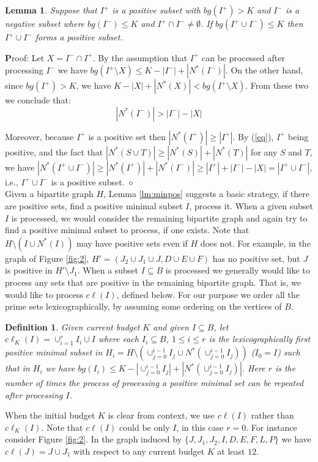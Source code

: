 \documentclass[letterpaper,11pt,abstracton]{scrartcl}
\newcommand{\qed}{\hfill$\diamond$}
\newcommand{\pf}{{\textbf Proof: }}
\newtheorem{lemma}[theorem]{Lemma}
\newtheorem{dfn}[theorem]{Definition}
\begin{document}
\begin{lemma}\label{correctness}
Suppose that $I^{+}$ is a positive subset with $bg(I^+) > K$
and $I^{-}$ is a negative subset where $bg(I^{-}) \le K$ and $I^+ \cap I^- \ne\emptyset$.
If $bg( I^{+} \cup I^{-}) \le K$ then $I^{+} \cup I^{-}$ forms a positive subset.
\end{lemma}
\pf Let $X=I^-\cap I^+$. By the assumption that $I^+$ can be processed after processing
$I^-$ we have $bg(I^+\setminus X)\leq K-|I^-|+|N^*(I^-)|$. On the other hand, since $bg(I^+)>K$, we have
$K-|X|+|N^*(X)|<bg(I^+\setminus X)$. From these two we conclude that:\\
\begin{equation}\label{eq}
|N^*(I^-)|>|I^-|-|X|
\end{equation}

Moreover, because $I^+$ is a positive set then $|N^*(I^+)|\geq |I^+|$.
By (\ref{eq}), $I^+$ being positive, and the fact that
$|N^*(S \cup T)| \geq |N^*(S)| + |N^*(T)|$ for any $S$ and $T$, we have
$|N^*(I^+\cup I^-)| \geq |N^*(I^+)|+|N^*(I^-)|\geq |I^+|+|I^-|-|X| = |I^+\cup I^-|$, i.e., $I^+\cup I^-$ is a positive subset.
\qed \\


Given a bipartite graph $H$, Lemma \ref{lm:minpos} suggests a basic strategy,
if there are positive sets, find a positive minimal subset $I$, process it.  When a given subset $I$ is processed, we
would consider the remaining bipartite graph and again try to find a positive
minimal subset to process, if one exists. Note that
$H\setminus (I\cup N^*(I))$ may have positive sets even if $H$ does not.
For example, in the graph of Figure \ref{fig:2},
$H'=(J_2\cup J_1 \cup J, D \cup E \cup F)$ has no positive set,
but $J$ is positive in $H'\setminus J_1$.  When a
subset $I\subseteq B$ is processed we generally would like to process
any sets that are positive in the remaining bipartite graph.  That is,
we would like to process $c\ell(I)$, defined below.
For our purpose we order all the prime sets lexicographically, by assuming some ordering on the vertices of $B$.

\begin{dfn}\label{def:closure}
  Given current budget $K$ and given $I\subseteq B$, let $c\ell_K(I)=\cup_{i=1}^{r} I_i \cup I $ where each $I_i \subseteq B$,
  $1 \le i \le r$ is the lexicographically first
   positive minimal subset in
   $H_i=H \setminus (\cup_{j=0}^{i-1} I_j \cup N^*(\cup_{j=0}^{i-1} I_j)) $
   ($I_0=I$) such that in $H_i$ we have $bg(I_{i}) \le K-|\cup_{j=0}^{i-1} I_j|+|N^*(\cup_{j=0}^{i-1} I_j)|$.  Here $r$ is the number of times the process of processing a positive minimal
set can be repeated after processing $I$.
\end{dfn}
When the initial budget $K$ is clear from context, we use $c\ell(I)$ rather than $c\ell_K(I)$.
Note that $c\ell(I)$ could be only $I$, in this case $r=0$. For instance consider Figure \ref{fig:2}. In the graph induced by $\{J,J_1,J_2,I,D,E,F,L,P\}$ we have $c\ell(J)=J\cup J_1$ with respect to any current budget $K$ at least $12$.
\end{document}
